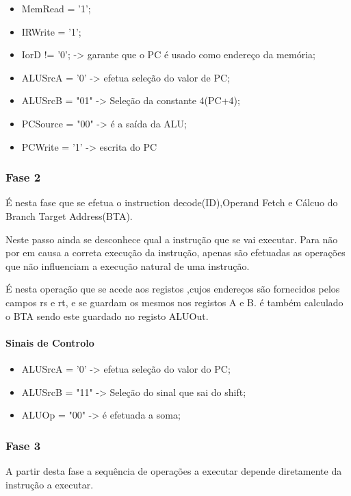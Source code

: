 \documentclass[10pt,a4paper]{book}
\begin{document}
			\begin{itemize}
				\item MemRead = '1';
				\item IRWrite = '1';
				\item IorD != '0';	-> garante que o PC é usado como endereço da memória;
				\item ALUSrcA = '0' -> efetua seleção do valor de PC;
				\item ALUSrcB = "01" -> Seleção da constante 4(PC+4);
				\item PCSource = "00" -> é a saída da ALU;
				\item PCWrite = '1' -> escrita do PC
			\end{itemize}


			\subsubsection*{Fase 2}

			É nesta fase que se efetua o instruction decode(ID),Operand Fetch e Cálcuo do Branch Target Address(BTA).

			Neste passo ainda se desconhece qual a instrução que se vai executar. Para não por em causa a correta execução da instrução, apenas são efetuadas as operações que não influenciam a execução natural de uma instrução.

			É nesta operação que se acede aos registos ,cujos endereços são fornecidos pelos campos rs e rt, e se guardam os mesmos nos registos A e B. é também calculado o BTA sendo este guardado no registo ALUOut.

			\paragraph{Sinais de Controlo}

			\begin{itemize}
				\item ALUSrcA = '0' -> efetua seleção do valor do PC;
				\item ALUSrcB = "11" -> Seleção do sinal que sai do shift;
				\item ALUOp = "00" -> é efetuada a soma;
			\end{itemize}


			\subsubsection{Fase 3}

			A partir desta fase a sequência de operações a executar depende diretamente da instrução a executar.
\end{document}
